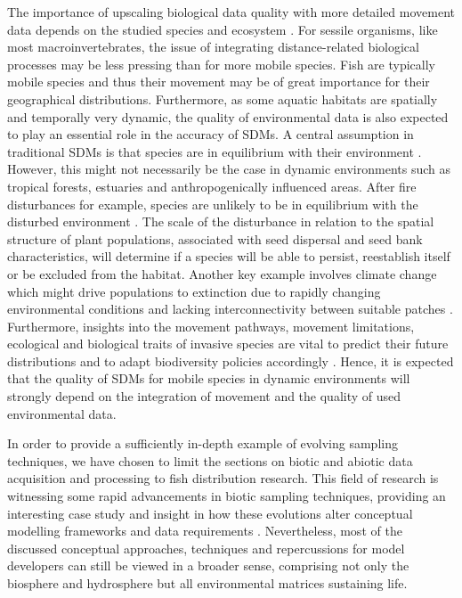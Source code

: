 \documentclass[12pt,authoryear]{elsarticle}
\begin{document}
The importance of upscaling biological data quality with more detailed movement data depends on the studied species and ecosystem \citep{Thuiller2015}. For sessile organisms, like most macroinvertebrates, the issue of integrating distance-related biological processes may be less pressing than for more mobile species. Fish are typically mobile species and thus their movement may be of great importance for their geographical distributions. Furthermore, as some aquatic habitats are spatially and temporally very dynamic, the quality of environmental data is also expected to play an essential role in the accuracy of SDMs. A central assumption in traditional SDMs is that species are in equilibrium with their environment \citep{Araujo2005,Elith2010}. However, this might not necessarily be the case in dynamic environments such as tropical forests, estuaries and anthropogenically influenced areas. After fire disturbances for example, species are unlikely to be in equilibrium with the disturbed environment \citep{Tucker2012}. The scale of the disturbance in relation to the spatial structure of plant populations, associated with seed dispersal and seed bank characteristics, will determine if a species will be able to persist, reestablish itself or be excluded from the habitat. Another key example involves climate change which might drive populations to extinction due to rapidly changing environmental conditions and lacking interconnectivity between suitable patches \citep{Araujo2005,Travis2013,Sinclair2010}. Furthermore, insights into the movement pathways, movement limitations, ecological and biological traits of invasive species are vital to predict their future distributions and to adapt biodiversity policies accordingly \citep{Gallien2012,Boets2014}. Hence, it is expected that the quality of SDMs for mobile species in dynamic environments will strongly depend on the integration of movement and the quality of used environmental data. 

In order to provide a sufficiently in-depth example of evolving sampling techniques, we have chosen to limit the sections on biotic and abiotic data acquisition and processing to fish distribution research. This field of research is witnessing some rapid advancements in biotic sampling techniques, providing an interesting case study and insight in how these evolutions alter conceptual modelling frameworks and data requirements \citep{Hussey2015,Donaldson2014,Metcalfe2012}. Nevertheless, most of the discussed conceptual approaches, techniques and repercussions for model developers can still be viewed in a broader sense, comprising not only the biosphere and hydrosphere but all environmental matrices sustaining life.
\end{document}
